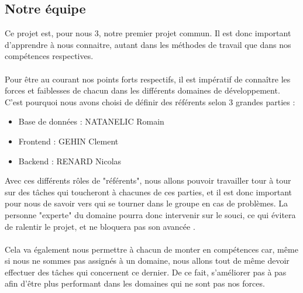 \documentclass{tnreport}
\begin{document}
\subsection*{Notre équipe}
\begin{sloppypar}
    Ce projet est, pour nous 3, notre premier projet commun. Il est donc important d'apprendre à nous connaitre, autant dans les méthodes de travail que dans nos compétences respectives.\\
    \\
    Pour être au courant nos points forts respectifs, il est impératif de connaître les forces et faiblesses de chacun dans les différents domaines de développement. C'est pourquoi nous avons choisi de définir des référents selon 3 grandes parties :\\
    \begin{itemize}
        \item[\textbullet]Base de données : NATANELIC Romain
        \item[\textbullet]Frontend : GEHIN Clement
        \item[\textbullet]Backend : RENARD Nicolas\\
    \end{itemize}
    Avec ces différents rôles de "référents", nous allons pouvoir travailler tour à tour sur des tâches qui toucheront à chacunes de ces parties, et il est donc important pour nous de savoir vers qui se tourner dans le groupe en cas de problèmes. La personne "experte" du domaine pourra donc intervenir sur le souci, ce qui évitera de ralentir le projet, et ne bloquera pas son avancée .\\
    \\
    Cela va également nous permettre à chacun de monter en compétences car, même si nous ne sommes pas assignés à un domaine, nous allons tout de même devoir effectuer des tâches qui concernent ce dernier. De ce fait, s'améliorer pas à pas afin d'être plus performant dans les domaines qui ne sont pas nos forces.
\end{sloppypar}
\end{document}
